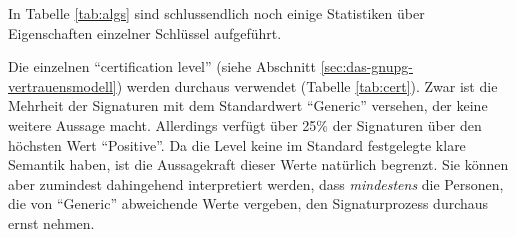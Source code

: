 \begin{table}[ht!]
  \footnotesize
  \centering
  \quad
  \quad
  \caption{Verwendung von Hashalgorithmen 
    , Public-Key-Algorithmen  und
    certification levels  in der grössten starken
    Zusammenhangskomponente}
\end{table}

In Tabelle \ref{tab:algs} sind schlussendlich noch einige Statistiken
über Eigenschaften einzelner Schlüssel aufgeführt. 

Die einzelnen ``certification level'' (siehe Abschnitt
\ref{sec:das-gnupg-vertrauensmodell}) werden durchaus verwendet
(Tabelle \ref{tab:cert}). Zwar ist die Mehrheit der Signaturen mit
dem Standardwert ``Generic'' versehen, der keine weitere Aussage
macht. Allerdings verfügt über 25\% der Signaturen über den
höchsten Wert ``Positive''. Da die Level keine im Standard
festgelegte klare Semantik haben, ist die Aussagekraft dieser Werte
natürlich begrenzt. Sie können aber zumindest dahingehend
interpretiert werden, dass \emph{mindestens} die Personen, die von
``Generic'' abweichende Werte vergeben, den Signaturprozess durchaus
ernst nehmen.

